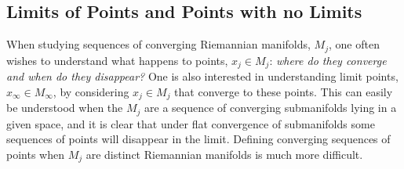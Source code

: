 \documentclass[12pt]{amsart}
\begin{document}
\subsection{Limits of Points and Points with no Limits}  

When studying sequences of converging Riemannian manifolds, $M_j$,
one often wishes to understand what happens to points, $x_j \in M_j$: {\em where
do they converge and when do they disappear?}
One is also interested in understanding limit points, $x_\infty \in M_\infty$,
by considering $x_j\in M_j$ that converge to these points.  This can
easily be understood when the $M_j$ are a sequence of converging
submanifolds lying in a given space, and it is clear that under flat
convergence of submanifolds some sequences of points will disappear
in the limit.  Defining converging sequences of points when $M_j$
are distinct Riemannian manifolds is much more difficult. 
\end{document}
